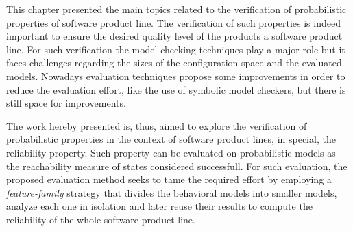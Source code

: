 This chapter presented the main topics related to the verification of
probabilistic properties of software product line. The verification of such
properties is indeed important to ensure the desired quality level of the
products a software product line. For such verification the model checking
techniques play a major role but it faces challenges regarding the sizes of the
configuration space and the evaluated models. Nowadays evaluation techniques
propose some improvements in order to reduce the evaluation effort, like the
use of symbolic model checkers, but there is still space for improvements. 

The work hereby presented is, thus, aimed to explore the verification of
probabilistic properties in the context of software product lines, in special,
the reliability property. Such property can be evaluated on probabilistic
models as the reachability measure of states considered successfull. For such
evaluation, the proposed evaluation method seeks to tame the required effort by
employing a \emph{feature-family} strategy that divides the behavioral models
into smaller models, analyze each one in isolation and later reuse their
results to compute the reliability of the whole software product line. 







